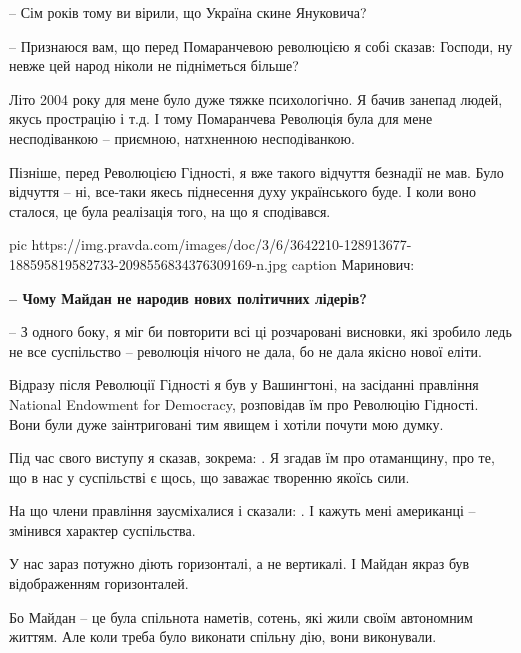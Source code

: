 – Сім років тому ви вірили, що Україна скине Януковича?

– Признаюся вам, що перед Помаранчевою революцією я собі сказав: Господи, ну
невже цей народ ніколи не підніметься більше?

Літо 2004 року для мене було дуже тяжке психологічно. Я бачив занепад людей,
якусь прострацію і т.д. І тому Помаранчева Революція була для мене
несподіванкою – приємною, натхненною несподіванкою. 

Пізніше, перед Революцією Гідності, я вже такого відчуття безнадії не мав. Було
відчуття – ні, все-таки якесь піднесення духу українського буде. І коли воно
сталося, це була реалізація того, на що я сподівався.

\ifcmt
pic https://img.pravda.com/images/doc/3/6/3642210-128913677-188595819582733-2098556834376309169-n.jpg
caption Маринович:  
\fi

{\bfseries 
– Чому Майдан не народив нових політичних лідерів?
}

– З одного боку, я міг би повторити всі ці розчаровані висновки, які зробило
ледь не все суспільство – революція нічого не дала, бо не дала якісно нової
еліти. 

Відразу після Революції Гідності я був у Вашингтоні, на засіданні правління
National Endowment for Democracy, розповідав їм про Революцію Гідності. Вони
були дуже заінтриговані тим явищем і хотіли почути мою думку. 

Під час свого виступу я сказав, зокрема: . Я згадав їм про
отаманщину, про те, що в нас у суспільстві є щось, що заважає творенню якоїсь
сили. 

На що члени правління заусміхалися і сказали: . І кажуть мені
американці – змінився характер суспільства.

У нас зараз потужно діють горизонталі, а не вертикалі. І Майдан якраз був
відображенням горизонталей. 

Бо Майдан – це була спільнота наметів, сотень, які жили своїм автономним
життям. Але коли треба було виконати спільну дію, вони виконували.


